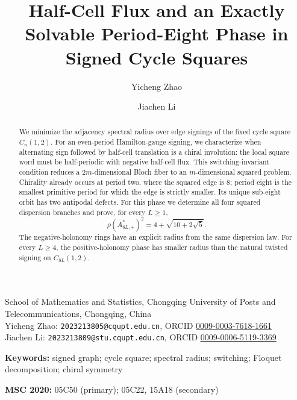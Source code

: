 \title{Half-Cell Flux and an Exactly Solvable Period-Eight Phase in Signed Cycle Squares}
\author{Yicheng Zhao \and Jiachen Li}
\date{}
\maketitle

\begin{center}
\small
School of Mathematics and Statistics, Chongqing University of Posts and
Telecommunications, Chongqing, China\\[2pt]
Yicheng Zhao: \texttt{2023213805@cqupt.edu.cn},
ORCID \href{https://orcid.org/0009-0003-7618-1661}{0009-0003-7618-1661}\\
Jiachen Li: \texttt{2023213809@stu.cqupt.edu.cn},
ORCID \href{https://orcid.org/0009-0006-5119-3369}{0009-0006-5119-3369}
\end{center}

\begin{abstract}
We minimize the adjacency spectral radius over edge signings of the fixed
cycle square $C_n(1,2)$.  For an even-period Hamilton-gauge signing, we
characterize when alternating sign followed by half-cell translation is a
chiral involution: the local square word must be half-periodic with negative
half-cell flux.  This switching-invariant condition reduces a
$2m$-dimensional Bloch fiber to an $m$-dimensional squared problem.  Chirality
already occurs at period two, where the squared edge is $8$; period eight is
the smallest primitive period for which the edge is strictly smaller.  Its
unique sub-eight orbit has two antipodal defects.  For this phase we determine
all four squared dispersion branches and prove, for every $L\geq1$,
\[
 \rho(A_{8L,+}^{*})^2=4+\sqrt{10+2\sqrt5}.
\]
The negative-holonomy rings have an explicit radius from the same dispersion
law.  For every $L\geq4$, the positive-holonomy phase has smaller radius than
the natural twisted signing on $C_{8L}(1,2)$.
\end{abstract}

\noindent\textbf{Keywords:} signed graph; cycle square; spectral radius;
switching; Floquet decomposition; chiral symmetry

\medskip
\noindent\textbf{MSC 2020:} 05C50 (primary); 05C22, 15A18 (secondary)
